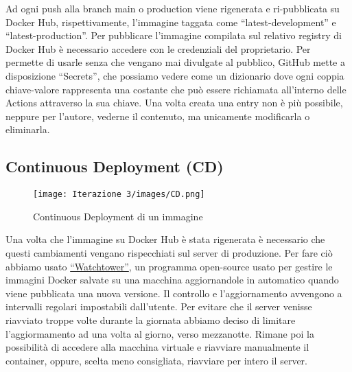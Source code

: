 Ad ogni push alla branch main o production viene rigenerata e ri-pubblicata su Docker Hub, rispettivamente, l'immagine taggata come ``latest-development'' e \\ ``latest-production''.
Per pubblicare l'immagine compilata sul relativo registry di Docker Hub è necessario accedere con le credenziali del proprietario. Per permette di usarle senza che vengano mai divulgate al pubblico, GitHub mette a disposizione ``Secrets'', che possiamo vedere come un dizionario dove ogni coppia chiave-valore rappresenta una costante che può essere richiamata all'interno delle Actions attraverso la sua chiave. Una volta creata una entry non è più possibile, neppure per l'autore, vederne il contenuto, ma unicamente modificarla o eliminarla.
\subsection{Continuous Deployment (CD)}
\label{sect:CD_it3}
\begin{figure}[h!]
  \centering
  \texttt{[image: Iterazione 3/images/CD.png]}
  \caption{Continuous Deployment di un immagine}
\end{figure}
Una volta che l'immagine su Docker Hub è stata rigenerata è necessario che questi cambiamenti vengano rispecchiati sul server di produzione. Per fare ciò abbiamo usato  \href{https://containrrr.dev/watchtower/}{``Watchtower''}, un programma open-source usato per gestire le immagini Docker salvate su una macchina aggiornandole in automatico quando viene pubblicata una nuova versione. Il controllo e l'aggiornamento avvengono a intervalli regolari impostabili dall'utente. Per evitare che il server venisse riavviato troppe volte durante la giornata abbiamo deciso di limitare l'aggiormamento ad una volta al giorno, verso mezzanotte. Rimane poi la possibilità di accedere alla macchina virtuale e riavviare manualmente il container, oppure, scelta meno consigliata, riavviare per intero il server.
